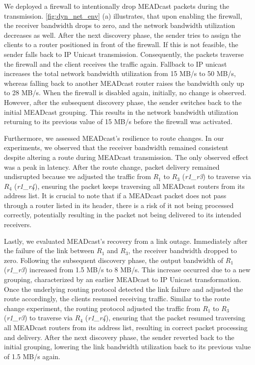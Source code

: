 We deployed a firewall to intentionally drop MEADcast packets during the
    transmission.
\autoref{fig:dyn_net_env} (a) illustrates, that upon enabling the firewall,
    the receiver bandwidth drops to zero, and the network bandwidth utilization
    decreases as well.
After the next discovery phase, the sender tries to assign the clients to a
    router positioned in front of the firewall.
If this is not feasible, the sender falls back to IP Unicast transmission.
Consequently, the packets traverse the firewall and the client receives the 
    traffic again.
Fallback to IP unicast increases the total network bandwidth utilization from
    15 MB/s to 50 MB/s, whereas falling back to another MEADcast router raises
    the bandwidth only up to 28 MB/s.
When the firewall is disabled again, initially, no change is observed.
However, after the subsequent discovery phase, the sender switches back to the
    initial MEADcast grouping.
This results in the network bandwidth utilization returning to its previous
    value of 15 MB/s before the firewall was activated.

Furthermore, we assessed MEADcast's resilience to route changes.
In our experiments, we observed that the receiver bandwidth remained consistent
    despite altering a route during MEADcast transmission.
The only observed effect was a peak in latency.
After the route change, packet delivery remained undisrupted because we
    adjusted the traffic from $R_1$ to $R_3$ (\textit{r1\_r3}) to traverse via
    $R_4$ (\textit{r1\_r4}), ensuring the packet keeps traversing all MEADcast
    routers from its address list.
It is crucial to note that if a MEADcast packet does not pass through a router
    listed in its header, there is a risk of it not being processed correctly,
    potentially resulting in the packet not being delivered to its intended
    receivers. 


Lastly, we evaluated MEADcast's recovery from a link outage.
Immediately after the failure of the link between $R_1$ and $R_3$, the receiver
    bandwidth dropped to zero.
Following the subsequent discovery phase, the output bandwidth of $R_1$
    (\textit{r1\_r3}) increased from 1.5 MB/s to 8 MB/s.
This increase occurred due to a new grouping, characterized by an earlier
    MEADcast to IP Unicast transformation.
Once the underlying routing protocol detected the link failure and adjusted
    the route accordingly, the clients resumed receiving traffic.
Similar to the route change experiment, the routing protocol adjusted the
    traffic from $R_1$ to $R_3$ (\textit{r1\_r3}) to traverse via $R_4$
    (\textit{r1\_r4}), ensuring that the packet resumed traversing all
    MEADcast routers from its address list, resulting in correct packet
    processing and delivery.
After the next discovery phase, the sender reverted back to the initial
    grouping, lowering the link bandwidth utilization back to its previous
    value of 1.5 MB/s again.

